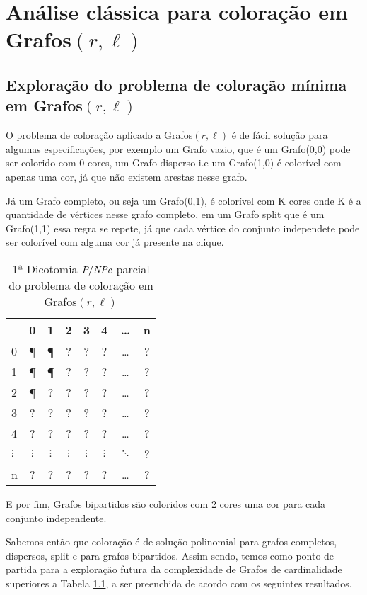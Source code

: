 \chapter{Análise clássica para coloração em Grafos$(r,\ell)$}

\section{Exploração do problema de coloração mínima em Grafos$(r,\ell)$}
O problema de coloração aplicado a Grafos$(r,\ell)$ é de fácil solução para algumas especificações,
por exemplo um Grafo vazio, que é um Grafo(0,0) pode ser colorido com 0 cores, um Grafo disperso i.e um Grafo(1,0) é colorível com apenas uma cor, já que não existem arestas nesse grafo.

Já um Grafo completo, ou seja um Grafo(0,1), é colorível com K cores onde K é a quantidade de vértices nesse grafo completo, em um Grafo split que é um Grafo(1,1) essa regra se repete, já que cada vértice do conjunto independete pode ser colorível com alguma cor já presente na clique.

\begin{table}[!htb]
	\center
	\begin{tabular}{l|*{7}c}
		\toprule
		\backslashbox{$r$}{$l$} & 0 & 1 & 2 & 3 & 4 & \ldots & n\\
		\midrule
		0 & \P & \P & ? & ? & ? & \ldots & ?\\
		1 & \P & \P & ? & ? & ? & \ldots & ?\\
		2 & \P & ? & ? & ? & ? & \ldots & ?\\
		3 & ? & ? & ? & ? & ? & \ldots & ?\\
		4 & ? & ? & ? & ? & ? & \ldots & ?\\
		$\vdots$ & $\vdots$ & $\vdots$ & $\vdots$ & $\vdots$ & $\vdots$ & $\ddots$ & ?\\
		n & ? & ? & ? & ? & ? & \ldots & ?\\
		\bottomrule
	\end{tabular}%
	\caption{1ª Dicotomia $\textit{P}/\textit{NPc}$ parcial do problema de coloração em Grafos$(r,\ell)$}
	\label{tab:tabela_part1dictrl}%
\end{table}%

E por fim, Grafos bipartidos são coloridos com 2 cores uma cor para cada conjunto independente.

Sabemos então que coloração é de solução polinomial para grafos completos, dispersos, split e para grafos bipartidos. Assim sendo, temos como ponto de partida para a exploração futura da complexidade de Grafos de cardinalidade superiores a Tabela \ref{tab:tabela_part1dictrl}, a ser preenchida de acordo com os seguintes resultados.

